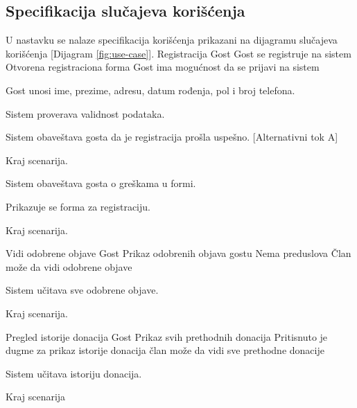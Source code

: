 \subsection{Specifikacija slučajeva korišćenja}
\par U nastavku se nalaze specifikacija korišćenja prikazani na dijagramu slučajeva korišćenja [Dijagram \ref{fig:use-case}].
        {Registracija}
        {Gost}
        {Gost se registruje na sistem}
        {Otvorena registraciona forma}
        {Gost ima mogućnost da se prijavi na sistem}
        {
            \item Gost unosi ime, prezime, adresu, datum rođenja, pol i broj telefona.
            \item Sistem proverava validnost podataka.
            \item Sistem obaveštava gosta da je registracija prošla uspešno. [Alternativni tok A]
            \item Kraj scenarija.
        }
        {
            {
                \item Sistem obaveštava gosta o greškama u formi.
                \item Prikazuje se forma za registraciju.
                \item Kraj scenarija.
            }
        }
          {Vidi odobrene objave}
          {Gost}
          {Prikaz odobrenih objava gostu}
          {Nema preduslova}
          {Član može da vidi odobrene objave}
          {
            \item Sistem učitava sve odobrene objave.
            \item Kraj scenarija.
          }
          {}

         {Pregled istorije donacija}
         {Gost}
         {Prikaz svih prethodnih donacija}
         {Pritisnuto je dugme za prikaz istorije donacija}
         {član može da vidi sve prethodne donacije}
         {
            \item Sistem učitava istoriju donacija.
            \item Kraj scenarija
         }
         {}


